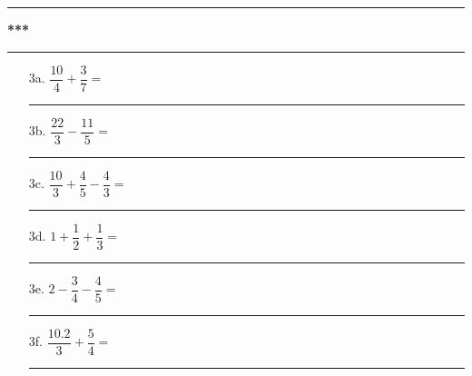 \documentclass[12pt]{article}
\begin{document}
\vspace{0.2cm}
\rule{0.48\linewidth}{1pt} \textbf{***} \rule{0.48\linewidth}{1pt}
\vspace{0.2cm}

\begin{enumerate}
\item[3a.] $\dfrac{10}{4} + \dfrac{3}{7}  =$\\
\rule{\linewidth}{0.5pt}
\item[3b.] $\dfrac{22}{3} - \dfrac{11}{5} =$\\
\rule{\linewidth}{0.5pt}
\item[3c.] $\dfrac{10}{3} + \dfrac{4}{5}  - \dfrac{4}{3} =$\\
\rule{\linewidth}{0.5pt}
\item[3d.] $            1 + \dfrac{1}{2}  + \dfrac{1}{3} =$\\
\rule{\linewidth}{0.5pt}
\item[3e.] $            2 - \dfrac{3}{4}  -\dfrac{4}{5}  =$\\
\rule{\linewidth}{0.5pt}
\item[3f.] $\dfrac{10.2}{3}  + \dfrac{5}{4} =$\\
\rule{\linewidth}{0.5pt}
\end{enumerate}
\end{document}
